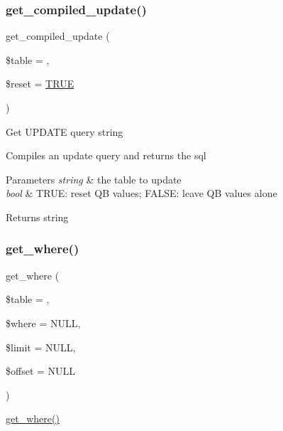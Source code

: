 \subsubsection{\texorpdfstring{get\+\_\+compiled\+\_\+update()}{get\_compiled\_update()}}
{\footnotesize\ttfamily get\+\_\+compiled\+\_\+update (\begin{DoxyParamCaption}\item[{}]{\$table = {\ttfamily \textquotesingle{}\textquotesingle{}},  }\item[{}]{\$reset = {\ttfamily \mbox{\hyperlink{constants_8php_ae04a3efe6aa42044f803ee90c2277846}{T\+R\+UE}}} }\end{DoxyParamCaption})}

Get U\+P\+D\+A\+TE query string

Compiles an update query and returns the sql


\begin{DoxyParams}{Parameters}
{\em string} & the table to update \\
\hline
{\em bool} & T\+R\+UE\+: reset QB values; F\+A\+L\+SE\+: leave QB values alone \\
\hline
\end{DoxyParams}
\begin{DoxyReturn}{Returns}
string 
\end{DoxyReturn}
\mbox{\label{class_c_i___d_b__query__builder_a8cae750fdc32b3c91544c091673fd17b}} 
\subsubsection{\texorpdfstring{get\+\_\+where()}{get\_where()}}
{\footnotesize\ttfamily get\+\_\+where (\begin{DoxyParamCaption}\item[{}]{\$table = {\ttfamily \textquotesingle{}\textquotesingle{}},  }\item[{}]{\$where = {\ttfamily NULL},  }\item[{}]{\$limit = {\ttfamily NULL},  }\item[{}]{\$offset = {\ttfamily NULL} }\end{DoxyParamCaption})}

\mbox{\hyperlink{class_c_i___d_b__query__builder_a8cae750fdc32b3c91544c091673fd17b}{get\+\_\+where()}}

